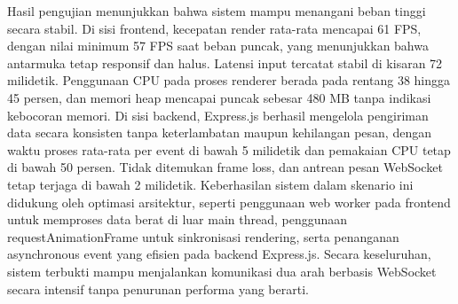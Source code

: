     Hasil pengujian menunjukkan bahwa sistem mampu menangani beban tinggi secara stabil. Di sisi frontend, kecepatan render rata-rata mencapai 61 FPS, dengan nilai minimum 57 FPS saat beban puncak, yang menunjukkan bahwa antarmuka tetap responsif dan halus. Latensi input tercatat stabil di kisaran 72 milidetik. Penggunaan CPU pada proses renderer berada pada rentang 38 hingga 45 persen, dan memori heap mencapai puncak sebesar 480 MB tanpa indikasi kebocoran memori. Di sisi backend, Express.js berhasil mengelola pengiriman data secara konsisten tanpa keterlambatan maupun kehilangan pesan, dengan waktu proses rata-rata per event di bawah 5 milidetik dan pemakaian CPU tetap di bawah 50 persen. Tidak ditemukan frame loss, dan antrean pesan WebSocket tetap terjaga di bawah 2 milidetik. Keberhasilan sistem dalam skenario ini didukung oleh optimasi arsitektur, seperti penggunaan web worker pada frontend untuk memproses data berat di luar main thread, penggunaan requestAnimationFrame untuk sinkronisasi rendering, serta penanganan asynchronous event yang efisien pada backend Express.js. Secara keseluruhan, sistem terbukti mampu menjalankan komunikasi dua arah berbasis WebSocket secara intensif tanpa penurunan performa yang berarti.
    